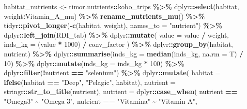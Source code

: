 \documentclass[
]{book}
\newenvironment{Shaded}{\begin{snugshade}}{\end{snugshade}}
\newcommand{\AttributeTok}[1]{\textcolor[rgb]{0.13,0.29,0.53}{#1}}
\newcommand{\DecValTok}[1]{\textcolor[rgb]{0.00,0.00,0.81}{#1}}
\newcommand{\FunctionTok}[1]{\textcolor[rgb]{0.13,0.29,0.53}{\textbf{#1}}}
\newcommand{\NormalTok}[1]{#1}
\newcommand{\OtherTok}[1]{\textcolor[rgb]{0.56,0.35,0.01}{#1}}
\newcommand{\SpecialCharTok}[1]{\textcolor[rgb]{0.81,0.36,0.00}{\textbf{#1}}}
\newcommand{\StringTok}[1]{\textcolor[rgb]{0.31,0.60,0.02}{#1}}
\begin{document}
\begin{Shaded}
\begin{Highlighting}[]
\NormalTok{habitat\_nutrients }\OtherTok{\textless{}{-}}
\NormalTok{  timor.nutrients}\SpecialCharTok{::}\NormalTok{kobo\_trips }\SpecialCharTok{\%\textgreater{}\%}
\NormalTok{  dplyr}\SpecialCharTok{::}\FunctionTok{select}\NormalTok{(habitat, weight}\SpecialCharTok{:}\NormalTok{Vitamin\_A\_mu) }\SpecialCharTok{\%\textgreater{}\%}
  \FunctionTok{rename\_nutrients\_mu}\NormalTok{() }\SpecialCharTok{\%\textgreater{}\%}
\NormalTok{  tidyr}\SpecialCharTok{::}\FunctionTok{pivot\_longer}\NormalTok{(}\SpecialCharTok{{-}}\FunctionTok{c}\NormalTok{(habitat, weight), }\AttributeTok{names\_to =} \StringTok{"nutrient"}\NormalTok{) }\SpecialCharTok{\%\textgreater{}\%}
\NormalTok{  dplyr}\SpecialCharTok{::}\FunctionTok{left\_join}\NormalTok{(RDI\_tab) }\SpecialCharTok{\%\textgreater{}\%}
\NormalTok{  dplyr}\SpecialCharTok{::}\FunctionTok{mutate}\NormalTok{(}
    \AttributeTok{value =}\NormalTok{ value }\SpecialCharTok{/}\NormalTok{ weight,}
    \AttributeTok{inds\_kg =}\NormalTok{ (value }\SpecialCharTok{*} \DecValTok{1000}\NormalTok{) }\SpecialCharTok{/}\NormalTok{ conv\_factor}
\NormalTok{  ) }\SpecialCharTok{\%\textgreater{}\%}
\NormalTok{  dplyr}\SpecialCharTok{::}\FunctionTok{group\_by}\NormalTok{(habitat, nutrient) }\SpecialCharTok{\%\textgreater{}\%}
\NormalTok{  dplyr}\SpecialCharTok{::}\FunctionTok{summarise}\NormalTok{(}\AttributeTok{inds\_kg =} \FunctionTok{median}\NormalTok{(inds\_kg, }\AttributeTok{na.rm =}\NormalTok{ T) }\SpecialCharTok{/} \DecValTok{10}\NormalTok{) }\SpecialCharTok{\%\textgreater{}\%}
\NormalTok{  dplyr}\SpecialCharTok{::}\FunctionTok{mutate}\NormalTok{(}\AttributeTok{inds\_kg =}\NormalTok{ inds\_kg }\SpecialCharTok{*} \DecValTok{100}\NormalTok{) }\SpecialCharTok{\%\textgreater{}\%}
\NormalTok{  dplyr}\SpecialCharTok{::}\FunctionTok{filter}\NormalTok{(}\SpecialCharTok{!}\NormalTok{nutrient }\SpecialCharTok{==} \StringTok{"selenium"}\NormalTok{) }\SpecialCharTok{\%\textgreater{}\%}
\NormalTok{  dplyr}\SpecialCharTok{::}\FunctionTok{mutate}\NormalTok{(}
    \AttributeTok{habitat =} \FunctionTok{ifelse}\NormalTok{(habitat }\SpecialCharTok{==} \StringTok{"Deep"}\NormalTok{, }\StringTok{"Pelagic"}\NormalTok{, habitat),}
    \AttributeTok{nutrient =}\NormalTok{ stringr}\SpecialCharTok{::}\FunctionTok{str\_to\_title}\NormalTok{(nutrient),}
    \AttributeTok{nutrient =}\NormalTok{ dplyr}\SpecialCharTok{::}\FunctionTok{case\_when}\NormalTok{(}
\NormalTok{      nutrient }\SpecialCharTok{==} \StringTok{"Omega3"} \SpecialCharTok{\textasciitilde{}} \StringTok{"Omega{-}3"}\NormalTok{,}
\NormalTok{      nutrient }\SpecialCharTok{==} \StringTok{"Vitamina"} \SpecialCharTok{\textasciitilde{}} \StringTok{"Vitamin{-}A"}\NormalTok{,}

\end{Highlighting}
\end{Shaded}
\end{document}

